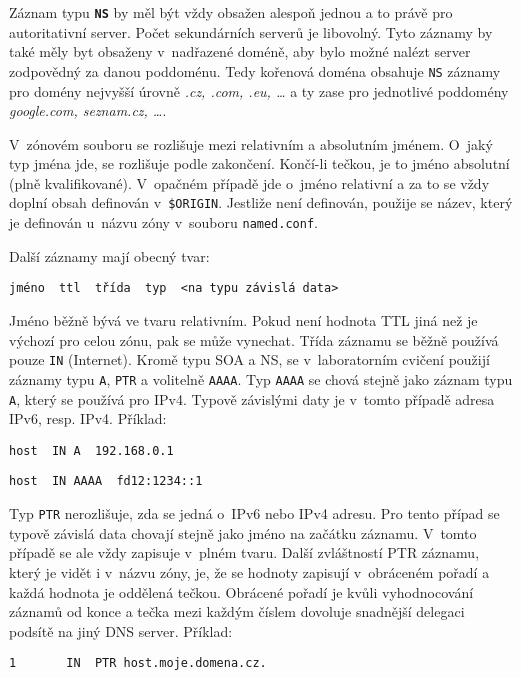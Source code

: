 Záznam typu {\tt\bf NS} by měl být vždy obsažen alespoň jednou a to právě pro autoritativní server. Počet sekundárních serverů je libovolný. Tyto záznamy by také měly byt obsaženy v~nadřazené doméně, aby bylo možné nalézt server zodpovědný za danou poddoménu. Tedy kořenová doména obsahuje {\tt NS} záznamy pro domény nejvyšší úrovně {\em .cz, .com, .eu, \dots} a ty zase pro jednotlivé poddomény {\em google.com, seznam.cz, \dots}.

V~zónovém souboru se rozlišuje mezi relativním a absolutním jménem. O~jaký typ jména jde, se rozlišuje podle zakončení. Končí-li tečkou, je to jméno absolutní (plně kvalifikované). V~opačném případě jde o~jméno relativní a za to se vždy doplní obsah definován v~{\tt \$ORIGIN}. Jestliže není definován, použije se název, který je definován u~názvu zóny v~souboru {\tt named.conf}.

Další záznamy mají obecný tvar:
\begin{verbatim}
jméno  ttl  třída  typ  <na typu závislá data>
\end{verbatim}
Jméno běžně bývá ve tvaru relativním. Pokud není hodnota TTL jiná než je výchozí pro celou zónu, pak se může vynechat. Třída záznamu se běžně používá pouze {\tt IN} (Internet). Kromě typu SOA a NS, se v~laboratorním cvičení použijí záznamy typu {\tt A}, {\tt PTR} a volitelně {\tt AAAA}. Typ {\tt AAAA} se chová stejně jako záznam typu {\tt A}, který se používá pro IPv4. Typově závislými daty je v~tomto případě adresa IPv6, resp. IPv4. Příklad:
\begin{verbatim}
host  IN A  192.168.0.1
\end{verbatim}
\begin{verbatim}
host  IN AAAA  fd12:1234::1
\end{verbatim}
Typ {\tt PTR} nerozlišuje, zda se jedná o~IPv6 nebo IPv4 adresu. Pro tento případ se typově závislá data chovají stejně jako jméno na začátku záznamu. V~tomto případě se ale vždy zapisuje v~plném tvaru. Další zvláštností PTR záznamu, který je vidět i v~názvu zóny, je, že se hodnoty zapisují v~obráceném pořadí a každá hodnota je oddělená tečkou. Obrácené pořadí je kvůli vyhodnocování záznamů od konce a tečka mezi každým číslem dovoluje snadnější delegaci podsítě na jiný DNS server. Příklad:
\begin{verbatim}
1		IN	PTR	host.moje.domena.cz.
\end{verbatim}

